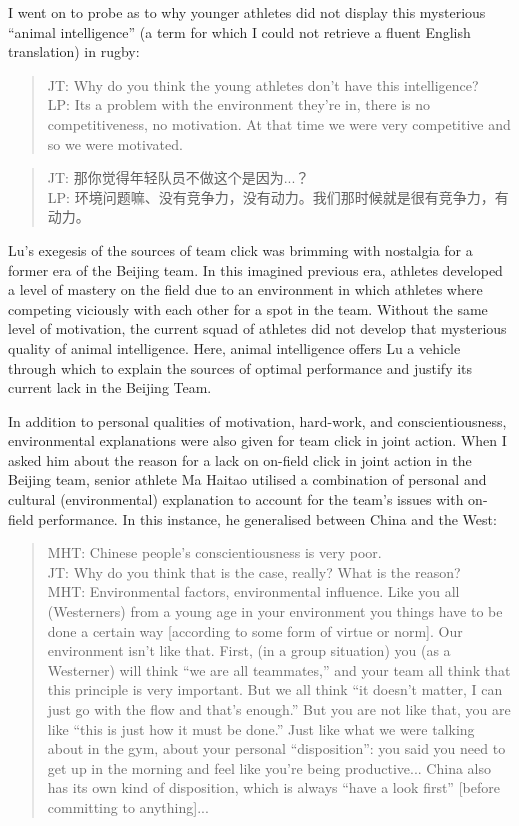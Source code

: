 \begin{CJK}{UTF8}{gbsn}
I went on to probe as to why younger athletes did not display this mysterious ``animal intelligence'' (a term for which I could not retrieve a fluent English translation) in rugby:

\begin{quote}
      JT: Why do you think the young athletes don't have this intelligence? \\
      LP: Its a problem with the environment they're in, there is no competitiveness, no motivation.  At that time we were very competitive and so we were motivated.
\end{quote}

\begin{quote}
      JT: 那你觉得年轻队员不做这个是因为...？\\
      LP: 环境问题嘛、没有竞争力，没有动力。我们那时候就是很有竞争力，有动力。
\end{quote}

Lu's exegesis of the sources of team click was brimming with nostalgia for a former era of the Beijing team.  In this imagined previous era,  athletes developed a level of mastery on the field due to an environment in which athletes where competing viciously with each other for a spot in the team.  Without the same level of motivation, the current squad of athletes did not develop that mysterious quality of animal intelligence.  Here, animal intelligence offers Lu a vehicle through which to explain the sources of optimal performance and justify its current lack in the Beijing Team.

In addition to personal qualities of motivation, hard-work, and conscientiousness, environmental explanations were also given for team click in joint action.  When I asked him about the reason for a lack on on-field click in joint action in the Beijing team, senior athlete Ma Haitao utilised a combination of personal and cultural (environmental) explanation to account for the team's issues with on-field performance.  In this instance, he generalised between China and the West:

\begin{quote}
  MHT: Chinese people's conscientiousness is very poor.\\
  JT: Why do you think that is the case, really? What is the reason? \\ MHT: Environmental factors, environmental influence.  Like you all (Westerners) from a young age in your environment you things have to be done a certain way [according to some form of virtue or norm].  Our environment isn't like that.  First, (in a group situation) you (as a Westerner) will think ``we are all teammates,'' and your team all think that this principle is very important.  But we all think ``it doesn't matter, I can just go with the flow and that's enough.''  But you are not like that, you are like ``this is just how it must be done.'' Just like what we were talking about in the gym, about your personal ``disposition'': you said you need to get up in the morning and feel like you're being productive... China also has its own kind of disposition, which is always ``have a look first'' [before committing to anything]...
\end{quote}


\end{CJK}
